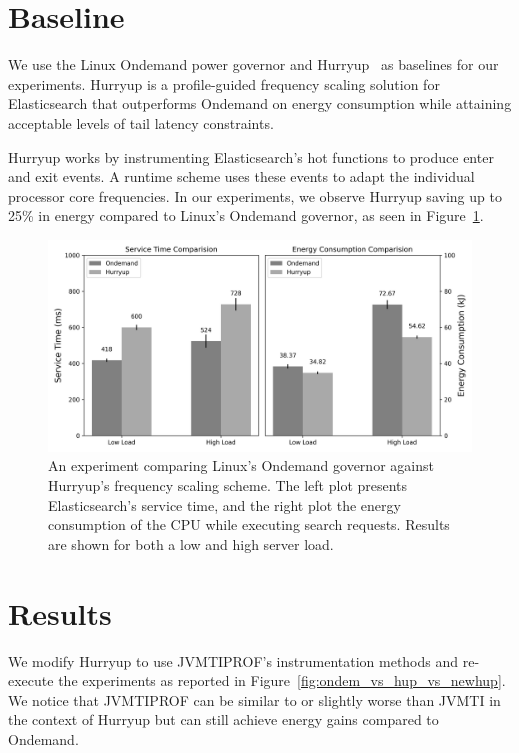 \section{Baseline}

We use the Linux Ondemand power governor and Hurryup~\cite{hurryupccgrid} as baselines for our experiments. Hurryup is a profile-guided frequency scaling solution for Elasticsearch that outperforms Ondemand on energy consumption while attaining acceptable levels of tail latency constraints.

Hurryup works by instrumenting Elasticsearch's hot functions to produce enter and exit events. A runtime scheme uses these events to adapt the individual processor core frequencies. In our experiments, we observe Hurryup saving up to 25\% in energy compared to Linux's Ondemand governor, as seen in Figure~\ref{fig:ondem_vs_hup}.

\begin{figure}[hb]
\centering
\includegraphics[width=1.0\textwidth]{src/figure/ondem_vs_hup.mono.png}
\caption{An experiment comparing Linux's Ondemand governor against Hurryup's frequency scaling scheme. The left plot presents Elasticsearch's service time, and the right plot the energy consumption of the CPU while executing search requests. Results are shown for both a low and high server load.}
\label{fig:ondem_vs_hup}
\end{figure}

\section{Results}

We modify Hurryup to use JVMTIPROF's instrumentation methods and re-execute the experiments as reported in Figure~\ref{fig:ondem_vs_hup_vs_newhup}. We notice that JVMTIPROF can be similar to or slightly worse than JVMTI in the context of Hurryup but can still achieve energy gains compared to Ondemand.

